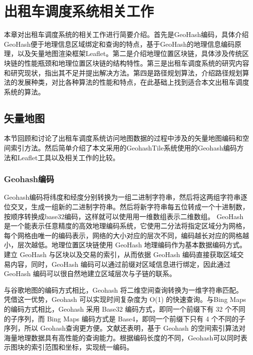 \chapter{出租车调度系统相关工作}
本章对出租车调度系统的相关工作进行简要介绍。首先是GeoHash编码，具体介绍GeoHash便于地理信息区域绑定和查询的特点，基于GeoHash的地理信息编码原理，以及矢量地图渲染框架Leaflet。第二是介绍地理位置区块链，具体涉及传统区块链的性能瓶颈和地理位置区块链的结构特性。第三是出租车调度系统的研究内容和研究现状，指出其不足并提出解决方法。第四是路径规划算法，介绍路径规划算法的发展种类，对比各种算法的性能和特点，在此基础上找到适合本文出租车调度系统的算法。

\section{矢量地图}
本节回顾和讨论了出租车调度系统访问地图数据的过程中涉及的矢量地图编码和空间索引方法。然后简单介绍了本文采用的GeohashTile系统使用的Geohash编码方法和Leaflet工具以及相关工作的比较。

\subsection{Geohash编码}
Geohash编码将纬度和经度分别转换为一组二进制字符串，然后将这两组字符串逐位交叉，生成一组新的二进制字符串。然后将新字符串每五位转成一个十进制数，按顺序转换成base32编码，这样就可以使用用一维数组表示二维数组。
GeoHash 是一个能表示任意精度的高效地理编码系统，它使用二分法将指定区域分为网格，每个网格由唯一的编码表示，网络的大小对应的层次不同，编码越长对应的网格越小，层次越低。地理位置区块链使用 GeoHash 地理编码作为基本数据编码方式。建立 GeoHash 与区块以及交易的索引，从而依据 GeoHash 编码直接获取区域交易内容，同时，GeoHash 编码可以通过前缀对区域信息进行绑定，因此通过 GeoHash 编码可以很自然地建立区域层次与子链的联系。

与谷歌地图的编码方式相比，Geohash 将二维空间查询转换为一维字符串匹配。凭借这一优势，Geohash 可以实现时间复杂度为 O(1)  的快速查询。与Bing Maps的编码方式相比，Geohash 采用 Base32 编码方式，即同一个前缀下有 32 个不同的子序列，而 Bing Maps 编码方式是 Base4，即同一个前缀下只有 4 个不同的子序列，所以 Geohash查询更方便。文献还表明，基于 Geohash 的空间索引算法对海量地理数据具有高性能的查询能力。根据编码长度的不同，Geohash可以同时表示图块的索引范围和坐标，实现统一编码。

